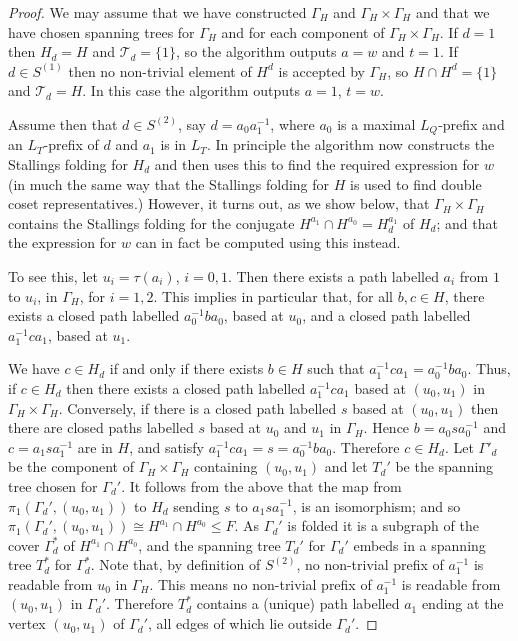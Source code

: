 \documentclass[a4paper,12pt]{article}
\newcommand{\G}{\Gamma }
\renewcommand{\t}{\tau }
\numberwithin{equation}{section}
\numberwithin{figure}{section}
\newcommand{\cT}{\mathcal{T}}
\begin{document}
\begin{proof}
We may assume that we have constructed $\G_H$ and $\G_H\times \G_H$ and
that we have chosen  spanning trees for $\G_H$ and for 
each component of 
 $\G_H\times \G_H$. 
If $d=1$ then $H_d=H$ and $\cT_d=\{1\}$, so the algorithm 
outputs $a=w$ and $t=1$.  
If $d\in S^{(1)}$ then no non-trivial element of $H^d$ is accepted 
by $\G_H$, so
$H\cap H^d=\{1\}$ and $\cT_d=H$. In this case the algorithm 
outputs $a=1$, $t=w$. 

Assume then that $d\in S^{(2)}$, say $d=a_0a_1^{-1}$, where 
$a_0$ is a maximal $L_Q$-prefix and an $L_T$-prefix of $d$ and $a_1$ is in 
$L_T$. 
In principle the algorithm  now constructs the 
Stallings folding for $H_d$ and then uses this to 
find the required expression for $w$ (in much the same 
way that the Stallings folding for $H$ is used to find double
coset representatives.) However, it turns out, as we show below, that
$\G_H\times \G_H$ contains the Stallings folding for the 
conjugate $H^{a_1}\cap H^{a_0}=H_d^{a_1}$ of $H_d$; and that 
the expression for $w$ can in fact be computed using this instead. 

To see this, let $u_i=\t(a_i)$, $i=0,1$. Then there exists
a path labelled $a_i$ from $1$ to $u_i$, in $\G_H$, for $i=1,2$.
 This implies in particular that, for 
all $b,c\in H$, there exists 
a closed path labelled $a_0^{-1}ba_0$, based at 
$u_0$, and  a closed path labelled $a_1^{-1}ca_1$, based at 
$u_1$. 

We have $c\in H_d$ if and only if there exists $b\in H$ such that
$a_1^{-1}ca_1=a_0^{-1}ba_0$. Thus, if $c\in H_d$ then 
 there exists a closed path
labelled $a_1^{-1}ca_1$ based at $(u_0,u_1)$ in $\G_H\times \G_H$. 
Conversely, if there is a closed path labelled $s$ based at 
$(u_0,u_1)$ then there are closed paths labelled 
$s$ based at $u_0$ and $u_1$ in $\G_H$. Hence 
$b=a_0sa_0^{-1}$ and $c=a_1sa_1^{-1}$ are in $H$, 
and satisfy $a_1^{-1}c a_1=s=a_0^{-1}ba_0$. Therefore $c \in H_d$. 
 Let $\G'_d$ be the component of $\G_H\times \G_H$
containing $(u_0,u_1)$ and let $T_d'$ be the spanning tree 
chosen for $\G_d'$. It follows from the above that the map
from $\pi_1(\G_d', (u_0,u_1))$ to $H_d$ sending $s$ to $a_1sa_1^{-1}$, is 
an isomorphism; and so  
$\pi_1(\G_d', (u_0,u_1))\cong H^{a_1}\cap H^{a_0}\le F$.
As $\G_d'$ is folded it is a subgraph of the cover
$\G_d^*$ of $H^{a_1}\cap H^{a_0}$, and the spanning tree $T_d'$ for 
$\G_d'$ embeds in a spanning tree $T_d^*$ for $\G_d^*$. 
Note that, by definition of $S^{(2)}$, no non-trivial prefix of 
$a_1^{-1}$ is readable from $u_0$ in $\G_H$. This means no non-trivial
prefix of $a_1^{-1}$ is readable from $(u_0,u_1)$ in $\G_d'$. Therefore
$T_d^*$ contains a (unique) path  labelled $a_1$ ending
at the vertex $(u_0,u_1)$ of $\G_d'$, all edges of which lie 
outside $\G_d'$. 


\end{proof}
\end{document}
